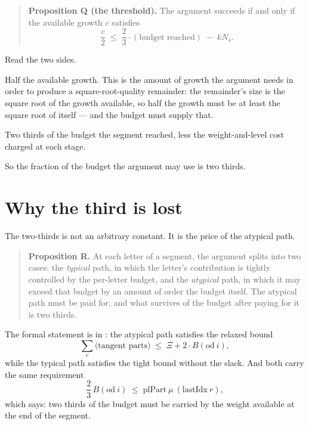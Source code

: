 \begin{quote}
\textbf{Proposition Q (the threshold).} The argument succeeds if and only if
the available growth $c$ satisfies
\[
\frac{c}{2} \;\le\; \frac{2}{3}\cdot(\text{budget reached}) \;-\; kN_s.
\]
\end{quote}

Read the two sides.

\begin{description}[style=nextline,leftmargin=0pt,labelwidth=0pt,labelsep=0pt,font=\sffamily\bfseries\small,
  itemsep=6pt]
\item[Left.] Half the available growth. This is the amount of growth the
argument needs in order to produce a square-root-quality remainder: the
remainder's size is the square root of the growth available, so half the
growth must be at least the square root of itself --- and the budget must
supply that.
\item[Right.] Two thirds of the budget the segment reached, less the
weight-and-level cost charged at each stage.
\end{description}

So the fraction of the budget the argument may use is two thirds.

\section{Why the third is lost}The two-thirds is not an arbitrary constant. It is the price of the atypical
path.

\begin{quote}
\textbf{Proposition R.} At each letter of a segment, the argument splits into
two cases: the \emph{typical} path, in which the letter's contribution is
tightly controlled by the per-letter budget, and the \emph{atypical} path, in
which it may exceed that budget by an amount of order the budget itself. The
atypical path must be paid for, and what survives of the budget after paying
for it is two thirds.
\end{quote}

The formal statement is  in
: the atypical path satisfies the
relaxed bound
\[
\sum_c \bigl(\text{tangent parts}\bigr) \;\le\; \Xi + 2\cdot B(\mathrm{od}\ i),
\]
while the typical path  satisfies the tight bound without the slack.
And both carry the same requirement
\[
\frac{2}{3}\,B(\mathrm{od}\ i) \;\le\; \mathrm{plPart}\ \mu\ (\mathrm{lastIdx}\ r),
\]
which says: two thirds of the budget must be carried by the weight available at
the end of the segment.

